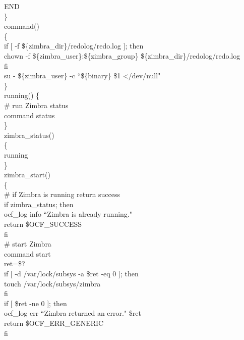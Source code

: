 \documentclass[a4paper, 12pt]{book}
\begin{document}
\noindent END\\
\noindent \}\\

\noindent command()\\
\{\\
  \indent if [ -f \$\{zimbra\_dir\}/redolog/redo.log ]; then\\
  \indent \indent chown -f \$\{zimbra\_user\}:\$\{zimbra\_group\} \$\{zimbra\_dir\}/redolog/redo.log\\
  \indent fi\\
  \indent su - \$\{zimbra\_user\} -c ``\$\{binary\} \$1 \textless /dev/null"\\
\}\\

\noindent running() \{\\
\indent \# run Zimbra status\\
\indent  command status\\
\}\\


\noindent zimbra\_status()\\
\{\\
    \indent running\\
\}\\

\noindent zimbra\_start()\\
\{\\
    \indent \# if Zimbra is running return success\\
    \indent if zimbra\_status; then\\
    \indent \indent ocf\_log info ``Zimbra is already running."\\
    \indent \indent return \$OCF\_SUCCESS\\
    \indent fi\\

    \indent \# start Zimbra\\
    \indent command start\\
    \indent ret=\$?\\
    \indent if [ -d /var/lock/subsys -a \$ret -eq 0 ]; then\\
    \indent \indent touch /var/lock/subsys/zimbra\\
    \indent fi\\

    \indent if [ \$ret -ne 0 ]; then\\
        \indent \indent ocf\_log err ``Zimbra returned an error." \$ret\\
        \indent \indent return \$OCF\_ERR\_GENERIC\\
    \indent fi\\
\end{document}
